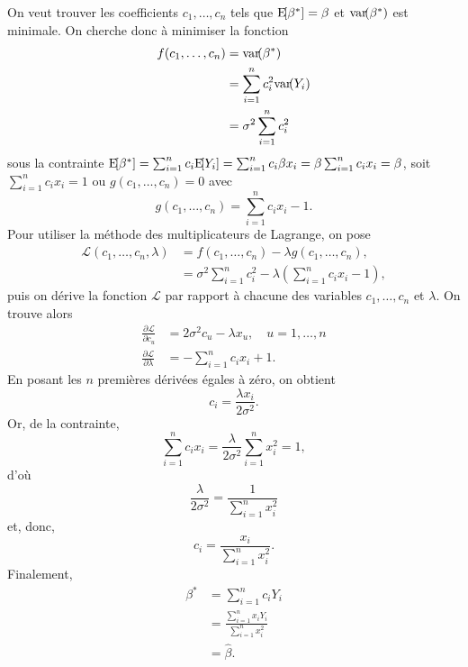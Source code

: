\begin{solution}{2.7}
    On veut trouver les coefficients $c_1, \dots, c_n$ tels que
    $\mathrm{E}\! [ \beta^* ] = \beta$ et $\mathrm{var}\! ( \beta^* )$ est minimale. On
    cherche donc à minimiser la fonction
    \begin{align*}
      f(c_1, \dots, c_n)
      &= \mathrm{var}\! ( \beta^* ) \\
      &= \sum_{i=1}^n c_i^2 \mathrm{var}\! ( Y_i ) \\
      &= \sigma^2 \sum_{i=1}^n c_i^2
    \end{align*}
    sous la contrainte $\mathrm{E}\! [ \beta^* ] = \sum_{i=1}^nc_i\mathrm{E}\! [ Y_i ] =
    \sum_{i=1}^nc_i\beta x_i = \beta\sum_{i=1}^nc_ix_i = \beta$, soit
    $\sum_{i=1}^n c_i x_i = 1$ ou $g(c_1, \dots, c_n) = 0$ avec
    \begin{displaymath}
      g(c_1, \dots, c_n) = \sum_{i=1}^n c_i x_i - 1.
    \end{displaymath}
    Pour utiliser la méthode des multiplicateurs de Lagrange, on pose
    \begin{align*}
      \mathcal{L}(c_1, \dots, c_n,\lambda)
      &= f(c_1, \dots, c_n) - \lambda g(c_1, \dots, c_n), \\
      &= \sigma^2 \sum_{i=1}^n c_i^2 - \lambda
      \left(
        \sum_{i=1}^n c_i x_i - 1
      \right),
    \end{align*}
    puis on dérive la fonction $\mathcal{L}$ par rapport à chacune des
    variables $c_1, \dots, c_n$ et $\lambda$. On trouve alors
    \begin{align*}
      \frac{\partial \mathcal{L}}{\partial c_u}
      & = 2 \sigma^2 c_u - \lambda x_u, \quad u = 1, \dots, n \\
      \frac{\partial \mathcal{L}}{\partial \lambda}
      & = - \sum_{i=1}^n c_i x_i + 1.
    \end{align*}
    En posant les $n$ premières dérivées égales à zéro, on obtient
    \begin{displaymath}
      c_i = \frac{\lambda x_i}{2 \sigma^2}.
    \end{displaymath}
    Or, de la contrainte,
    \begin{displaymath}
      \sum_{i=1}^n c_i x_i =
      \frac{\lambda}{2\sigma^2} \sum_{i=1}^n x_i^2 = 1,
    \end{displaymath}
    d'où
    \begin{displaymath}
      \frac{\lambda}{2 \sigma^2} = \frac{1}{\sum_{i=1}^n x_i^2}
    \end{displaymath}
    et, donc,
    \begin{displaymath}
      c_i = \frac{x_i}{\sum_{i=1}^n x_i^2}.
    \end{displaymath}
    Finalement,
    \begin{align*}
      \beta^*
      & = \sum_{i=1}^n c_i Y_i \\
      & = \frac{\sum_{i=1}^n x_i Y_i}{\sum_{i=1}^n x_i^2} \\
      & = \hat{\beta}.
    \end{align*}
  
\end{solution}
